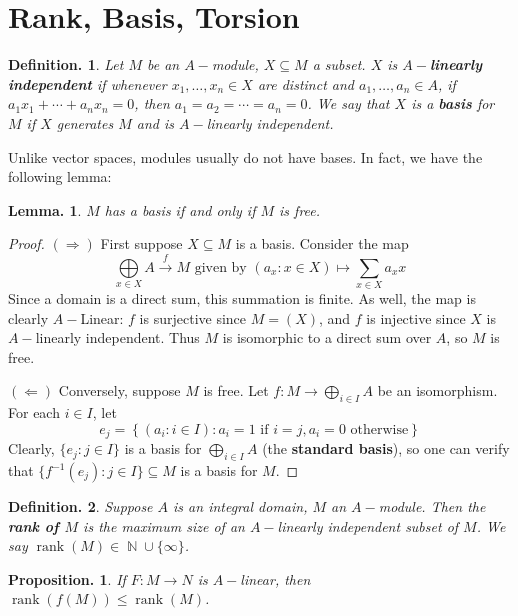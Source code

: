 \documentclass[11pt, a4paper]{memoir}
\DeclareMathOperator{\N}{{\mathbb{N}}}
\newcommand{\fto}[1]{\ensuremath{\xrightarrow{\scriptstyle{#1}}}}
\theoremstyle{change}
\newtheorem{lemma}[theorem]{Lemma.}
\newtheorem{proposition}[theorem]{Proposition.}
\theoremstyle{plain}
\theoremstyle{nonumberplain}
\newtheorem{definition}{Definition.}
\newtheorem{proof}{Proof}
\DeclareMathOperator{\rank}{rank}
\numberwithin{equation}{section}
\begin{document}
\section{Rank, Basis, Torsion}
\begin{definition}
    Let $M$ be an $A-$module, $X\subseteq M$ a subset.
    $X$ is \textbf{$A-$linearly independent} if whenever $x_1,\ldots,x_n\in X$ are distinct and $a_1,\ldots,a_n\in A$, if $a_1x_1+\cdots+a_nx_n=0$, then $a_1=a_2=\cdots=a_n=0$.
    We say that $X$ is a \textbf{basis} for $M$ if $X$ generates $M$ and is $A-$linearly independent.
\end{definition}
Unlike vector spaces, modules usually do not have bases.
In fact, we have the following lemma:
\begin{lemma}
    $M$ has a basis if and only if $M$ is free.
\end{lemma}
\begin{proof}
    $(\Rightarrow)$ First suppose $X\subseteq M$ is a basis.
    Consider the map
    \begin{equation*}
        \bigoplus\limits_{x\in X}A\fto{f} M\text{ given by }(a_x:x\in X)\mapsto\sum\limits_{x\in X}a_xx
    \end{equation*}
    Since a domain is a direct sum, this summation is finite.
    As well, the map is clearly $A-$Linear: $f$ is surjective since $M=(X)$, and $f$ is injective since $X$ is $A-$linearly independent.
    Thus $M$ is isomorphic to a direct sum over $A$, so $M$ is free.

    $(\Leftarrow)$ Conversely, suppose $M$ is free.
    Let $f:M\to\bigoplus_{i\in I}A$ be an isomorphism.
    For each $i\in I$, let
    \begin{equation*}
        e_j=\left\{(a_i:i\in I): a_i=1\text{ if }i=j, a_i=0\text{ otherwise}\right\}
    \end{equation*}
    Clearly, $\{e_j:j\in I\}$ is a basis for $\bigoplus_{i\in I}A$ (the \textbf{standard basis}), so one can verify that $\{f^{-1}(e_j):j\in I\}\subseteq M$ is a basis for $M$.
\end{proof}
\begin{definition}
    Suppose $A$ is an integral domain, $M$ an $A-$module.
    Then the \textbf{rank of $M$} is the maximum size of an $A-$linearly independent subset of $M$.
    We say $\rank(M)\in\N\cup\{\infty\}$.
\end{definition}
\begin{proposition}
    If $F:M\to N$ is $A-$linear, then $\rank(f(M))\leq\rank(M)$.
\end{proposition}
\end{document}
